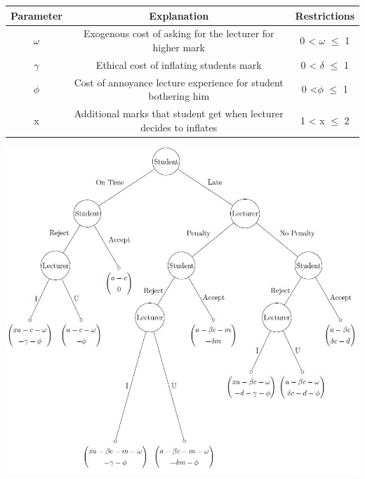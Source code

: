 \documentclass[11pt,preprint, authoryear]{elsarticle}
\let\origtable\table
\let\endorigtable\endtable
\renewenvironment{table}[1][2] {
    \expandafter\origtable\expandafter[H]
} {
    \endorigtable
}
\numberwithin{equation}{section}
\numberwithin{figure}{section}
\numberwithin{table}{section}
\begin{document}
\begin{table}
\caption{Extended Game Parameters}
\centering
\begin{tabular}{c c c} \hline
Parameter & Explanation & Restrictions \\
\hline 
\(\omega\) & Exogenous cost of asking for the lecturer for higher mark & 0 < \(\omega\) $\le$ 1 \\
\(\gamma\) & Ethical cost of inflating students mark & 0 < \(\delta\) $\le$ 1 \\
\(\phi\) & Cost of annoyance lecture experience for student bothering him & 0 <\(\phi\) $\le$ 1 \\
x & Additional marks that student get when lecturer decides to inflates &  1 < x $\le$ 2 \\ [1ex]
\hline 
\end{tabular}
\label{table:ext}
\end{table}

\begin{center}
\includegraphics[scale=0.90]{"img/extend.jpg"}
\label{fig:extd}
\end{center}
\end{document}
